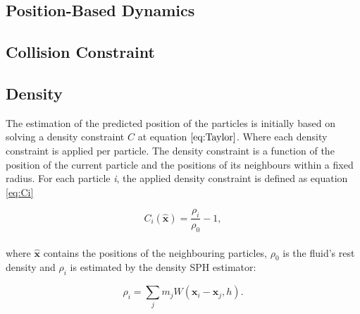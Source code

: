 \subsection{Position-Based Dynamics}



\subsection{Collision Constraint}





\subsection{Density}

The estimation of the predicted position of the particles is initially based on solving a density constraint $C$ at equation $\ref{eq:Taylor}$. Where each density constraint is applied per particle. The density constraint is a function of the position of the current particle and the positions of its neighbours within a fixed radius. For each particle \textit{i}, the applied density constraint is defined as equation \ref{eq:Ci}

\begin{equation}
\label{eq:Ci}
C_i(\hat{\mathbf{x}}) = \frac{\rho_i}{\rho_0} - 1,
\end{equation}
\\
where $\hat{\mathbf{x}}$ contains the positions of the neighbouring particles, $\rho_0$ is the fluid's rest density and $\rho_i$ is estimated by the density SPH estimator:

\begin{equation}
\label{eq:Rhoi}
\rho_i = \sum\limits_{j} m_j W(\mathbf{x}_i - \mathbf{x}_j, h).
\end{equation}

